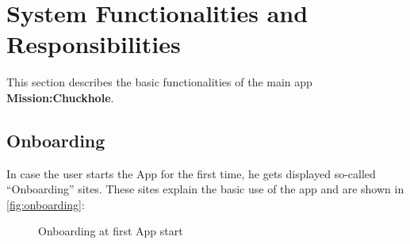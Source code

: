 \documentclass[10pt,a4paper]{article} %
\begin{document}
    
    \section{System Functionalities and Responsibilities}

	This section describes the basic functionalities of the main app \textbf{Mission:Chuckhole}.



	\subsection{Onboarding}
		In case the user starts the App for the first time, he gets displayed so-called ``Onboarding'' sites.
		These sites explain the basic use of the app and are shown in \autoref{fig:onboarding}:


	\begin{figure}[H]
	  \centering
	  \hfill
	  \hfill
	  \caption{Onboarding at first App start}
	  \label{fig:onboarding}
	\end{figure}
\end{document}
